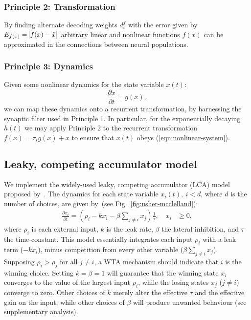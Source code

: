 \documentclass[10pt,letterpaper]{article}
\begin{document}
\subsubsection{Principle 2: Transformation}
By finding alternate decoding weights $d^f_i$ with the error given by $E_{f(x)} 
= \abs{f(x) - \hat x}$ arbitrary linear and nonlinear functions $f(x)$ can be approximated in the connections between neural populations.

\subsubsection{Principle 3: Dynamics}
Given some nonlinear dynamics for the state variable $x(t)$:
\begin{equation} \label{eqn:nonlinear-system}
    \frac{\partial x}{\partial t} = g(x) ,
\end{equation}
we can map these dynamics onto a recurrent transformation, by harnessing the synaptic filter used in Principle 1.
In particular, for the exponentially decaying $h(t)$ we may apply Principle 2 to the recurrent transformation $f(x) = \tau_s g(x) + x$ to ensure that $x(t)$ obeys (\ref{eqn:nonlinear-system}).

\subsection{Leaky, competing accumulator model}
We implement the widely-used leaky, competing accumulator (LCA) model proposed by~.
The dynamics for each state variable $x_i(t),\ i < d$, where $d$ is the number of choices, are given by~(see Fig.~\ref{fig:usher-mcclelland}):
\begin{equation} \label{eqn:usher-mcclelland}
    \begin{split}
        \frac{{\partial x}_i}{\partial t} = \left(\rho_i - kx_i - \beta \sum_{j \neq i} x_j\right) \frac{1}{\tau}, \quad x_i &\ge 0,
    \end{split}
\end{equation}
where $\rho_i$ is each external input, $k$ is the leak rate, $\beta$ the lateral inhibition, and $\tau$ the time-constant.
This model essentially integrates each input $\rho_i$ with a leak term ($- kx_i$), minus competition from every other variable ($\beta \sum_{j \neq i} x_j$).
Supposing $\rho_i > \rho_j$ for all $j \ne i$, a WTA mechanism should indicate that $i$ is the winning choice.
Setting $k = \beta = 1$ will guarantee that the winning state $x_i$ converges to the value of the largest input $\rho_i$, while the losing states $x_j$ ($j \ne i$) converge to zero.
Other choices of $k$ merely alter the effective $\tau$ and the effective gain on the input, while other choices of $\beta$ will produce unwanted behaviour (see supplementary analysis).
\end{document}
